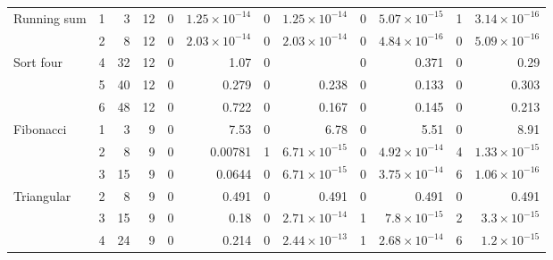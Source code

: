 \begin{table}[htbp]
\begin{tabular*}{\linewidth}{@{\extracolsep{\fill}}lrrr *{4}{rr}@{}}
Running sum & 1 & 3 & 12 & 0 & $1.25\!\times\!10^{-14}$ & 0 & $1.25\!\times\!10^{-14}$ & 0 & $5.07\!\times\!10^{-15}$ & 1 & $3.14\!\times\!10^{-16}$ \\
 & 2 & 8 & 12 & 0 & $2.03\!\times\!10^{-14}$ & 0 & $2.03\!\times\!10^{-14}$ & 0 & $4.84\!\times\!10^{-16}$ & 0 & $5.09\!\times\!10^{-16}$ \\
\addlinespace[0.7pt]
Sort four & 4 & 32 & 12 & 0 & 1.07 & 0 & {\bfseries\boldmath 0.243} & 0 & 0.371 & 0 & 0.29 \\
 & 5 & 40 & 12 & 0 & 0.279 & 0 & 0.238 & 0 & 0.133 & 0 & 0.303 \\
 & 6 & 48 & 12 & 0 & 0.722 & 0 & 0.167 & 0 & 0.145 & 0 & 0.213 \\
\addlinespace[0.7pt]
Fibonacci & 1 & 3 & 9 & 0 & 7.53 & 0 & 6.78 & 0 & 5.51 & 0 & 8.91 \\
 & 2 & 8 & 9 & 0 & 0.00781 & 1 & $6.71\!\times\!10^{-15}$ & 0 & $4.92\!\times\!10^{-14}$ & 4 & $1.33\!\times\!10^{-15}$ \\
 & 3 & 15 & 9 & 0 & 0.0644 & 0 & $6.71\!\times\!10^{-15}$ & 0 & $3.75\!\times\!10^{-14}$ & 6 & $1.06\!\times\!10^{-16}$ \\
\addlinespace[0.7pt]
Triangular & 2 & 8 & 9 & 0 & 0.491 & 0 & 0.491 & 0 & 0.491 & 0 & 0.491 \\
 & 3 & 15 & 9 & 0 & 0.18 & 0 & $2.71\!\times\!10^{-14}$ & 1 & $7.8\!\times\!10^{-15}$ & 2 & $3.3\!\times\!10^{-15}$ \\
 & 4 & 24 & 9 & 0 & 0.214 & 0 & $2.44\!\times\!10^{-13}$ & 1 & $2.68\!\times\!10^{-14}$ & 6 & $1.2\!\times\!10^{-15}$ \\
\bottomrule
\end{tabular*}\endgroup
\end{table}

